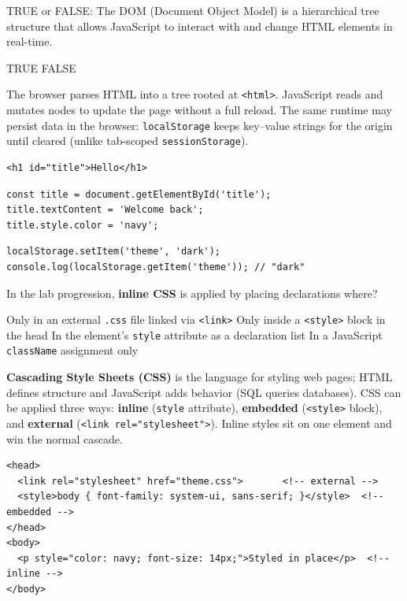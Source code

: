 \question[4]
TRUE or FALSE: The DOM (Document Object Model) is a hierarchical tree structure that allows JavaScript to interact with and change HTML elements in real-time.
\begin{choices}
  \CorrectChoice TRUE
  \choice FALSE
\end{choices}
\begin{solution}
  The browser parses HTML into a tree rooted at \texttt{<html>}. JavaScript reads and mutates nodes to update the page without a full reload. The same runtime may persist data in the browser: \lstinline[style=jsinline]|localStorage| keeps key--value strings for the origin until cleared (unlike tab-scoped \lstinline[style=jsinline]|sessionStorage|).
\begin{lstlisting}[style=htmlinline]
<h1 id="title">Hello</h1>
\end{lstlisting}
\begin{lstlisting}[style=js]
const title = document.getElementById('title');
title.textContent = 'Welcome back';
title.style.color = 'navy';
\end{lstlisting}
\begin{lstlisting}[style=js]
localStorage.setItem('theme', 'dark');
console.log(localStorage.getItem('theme')); // "dark"
\end{lstlisting}
\end{solution}


\question[4]
In the lab progression, \textbf{inline CSS} is applied by placing declarations where?
\begin{choices}
  \choice Only in an external \texttt{.css} file linked via \texttt{<link>}
  \choice Only inside a \texttt{<style>} block in the head
  \CorrectChoice In the element's \texttt{style} attribute as a declaration list
  \choice In a JavaScript \texttt{className} assignment only
\end{choices}
\begin{solution}
  \textbf{Cascading Style Sheets (CSS)} is the language for styling web pages; HTML defines structure and JavaScript adds behavior (SQL queries databases). CSS can be applied three ways: \textbf{inline} (\texttt{style} attribute), \textbf{embedded} (\texttt{<style>} block), and \textbf{external} (\texttt{<link rel="stylesheet">}). Inline styles sit on one element and win the normal cascade.
\begin{lstlisting}[style=htmlinline]
<head>
  <link rel="stylesheet" href="theme.css">       <!-- external -->
  <style>body { font-family: system-ui, sans-serif; }</style>  <!-- embedded -->
</head>
<body>
  <p style="color: navy; font-size: 14px;">Styled in place</p>  <!-- inline -->
</body>
\end{lstlisting}
\end{solution}

